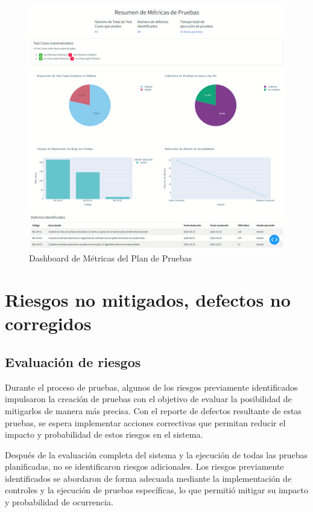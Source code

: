 \documentclass[stu, 12pt, letterpaper, donotrepeattitle, floatsintext, natbib]{apa7}
\begin{document}
\begin{figure}[H]
    \label{fig:dashboard_metrica_pruebas}
    \centering
    \includegraphics[width=\textwidth]{../imgs/new_dashboard.png}
    \caption{Dashboard de Métricas del Plan de Pruebas}
\end{figure}


\newpage
\section{\large Riesgos no mitigados, defectos no corregidos}

\subsection{Evaluación de riesgos}

\noindent Durante el proceso de pruebas, algunos de los riesgos previamente identificados impulsaron la creación de pruebas con el objetivo de evaluar la posibilidad de mitigarlos de manera más precisa. Con el reporte de defectos resultante de estas pruebas, se espera implementar acciones correctivas que permitan reducir el impacto y probabilidad de estos riesgos en el sistema.

\noindent Después de la evaluación completa del sistema y la ejecución de todas las pruebas planificadas, no se identificaron riesgos adicionales. Los riesgos previamente identificados se abordaron de forma adecuada mediante la implementación de controles y la ejecución de pruebas específicas, lo que permitió mitigar su impacto y probabilidad de ocurrencia.
\end{document}
